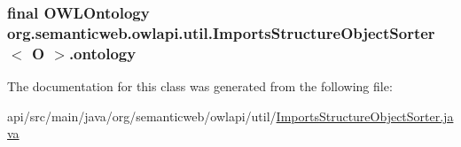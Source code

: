 \hypertarget{classorg_1_1semanticweb_1_1owlapi_1_1util_1_1_imports_structure_object_sorter_3_01_o_01_4_a466a7e19b6fa657a7079ec9ed7860bf7}{
\subsubsection[{ontology}]{\setlength{\rightskip}{0pt plus 5cm}final {\bf O\-W\-L\-Ontology} org.\-semanticweb.\-owlapi.\-util.\-Imports\-Structure\-Object\-Sorter$<$ O $>$.ontology\hspace{0.3cm}{\ttfamily [private]}}}\label{classorg_1_1semanticweb_1_1owlapi_1_1util_1_1_imports_structure_object_sorter_3_01_o_01_4_a466a7e19b6fa657a7079ec9ed7860bf7}


The documentation for this class was generated from the following file\-:\begin{DoxyCompactItemize}
\item 
api/src/main/java/org/semanticweb/owlapi/util/\hyperlink{_imports_structure_object_sorter_8java}{Imports\-Structure\-Object\-Sorter.\-java}\end{DoxyCompactItemize}
